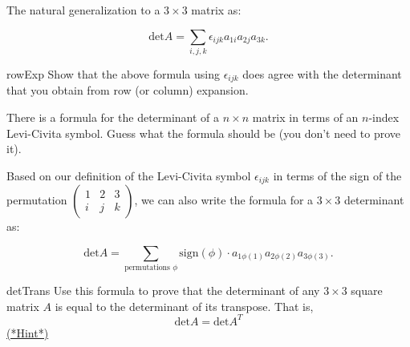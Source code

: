 The natural generalization to a $3 \times 3$ matrix as:

\[ \text{det} A = \sum_{i,j,k} \epsilon_{ijk} a_{1i} a_{2j} a_{3k}. \]

\noindent

\begin{exercise}{rowExp}
Show that the above formula using $\epsilon_{ijk}$ does agree with the determinant that you obtain from row (or column)  expansion.
\end{exercise}

\begin{exercise}{}
There is a formula for the determinant of a $n \times n$  matrix in terms of an $n$-index Levi-Civita symbol. Guess what the formula should be (you don't need to prove it).
\end{exercise}


Based on our definition of the Levi-Civita symbol $\epsilon_{ijk}$ in terms of the sign of the permutation $ \left( \begin{smallmatrix}  1 & 2 & 3  \\ i & j & k  \end{smallmatrix} \right)$, we can also write the formula for a $3 \times 3$ determinant as:

\[ \text{det} A = \sum_{\text{permutations } \phi} \text{sign}(\phi) \cdot a_{1\phi(1)} a_{2\phi(2)} a_{3\phi(3)}. \]

\begin{exercise}{detTrans}
Use this formula to prove that the determinant of any $3 \times 3$ square matrix $A$ is equal to the determinant of its transpose.  That is, 
\[ \text{det} A = \text{det}A^{T} \]
\hyperref[sec:SigmaNotation:Hints]{(*Hint*)} 
\end{exercise}

